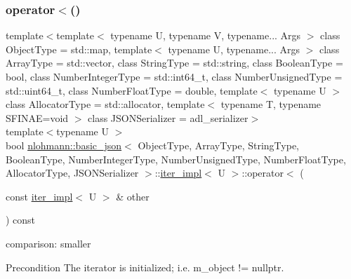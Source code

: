 \subsubsection{\texorpdfstring{operator$<$()}{operator<()}}
{\footnotesize\ttfamily template$<$template$<$ typename U, typename V, typename... Args $>$ class Object\+Type = std\+::map, template$<$ typename U, typename... Args $>$ class Array\+Type = std\+::vector, class String\+Type  = std\+::string, class Boolean\+Type  = bool, class Number\+Integer\+Type  = std\+::int64\+\_\+t, class Number\+Unsigned\+Type  = std\+::uint64\+\_\+t, class Number\+Float\+Type  = double, template$<$ typename U $>$ class Allocator\+Type = std\+::allocator, template$<$ typename T, typename S\+F\+I\+N\+A\+E=void $>$ class J\+S\+O\+N\+Serializer = adl\+\_\+serializer$>$ \\
template$<$typename U $>$ \\
bool \hyperlink{classnlohmann_1_1basic__json}{nlohmann\+::basic\+\_\+json}$<$ Object\+Type, Array\+Type, String\+Type, Boolean\+Type, Number\+Integer\+Type, Number\+Unsigned\+Type, Number\+Float\+Type, Allocator\+Type, J\+S\+O\+N\+Serializer $>$\+::\hyperlink{classnlohmann_1_1basic__json_1_1iter__impl}{iter\+\_\+impl}$<$ U $>$\+::operator$<$ (\begin{DoxyParamCaption}\item[{const \hyperlink{classnlohmann_1_1basic__json_1_1iter__impl}{iter\+\_\+impl}$<$ U $>$ \&}]{other }\end{DoxyParamCaption}) const\hspace{0.3cm}{\ttfamily [inline]}}



comparison\+: smaller 

\begin{DoxyPrecond}{Precondition}
The iterator is initialized; i.\+e. {\ttfamily m\+\_\+object != nullptr}. 
\end{DoxyPrecond}
\mbox{\label{classnlohmann_1_1basic__json_1_1iter__impl_a5ed57d38f57f669f5788cea881772403}} 

